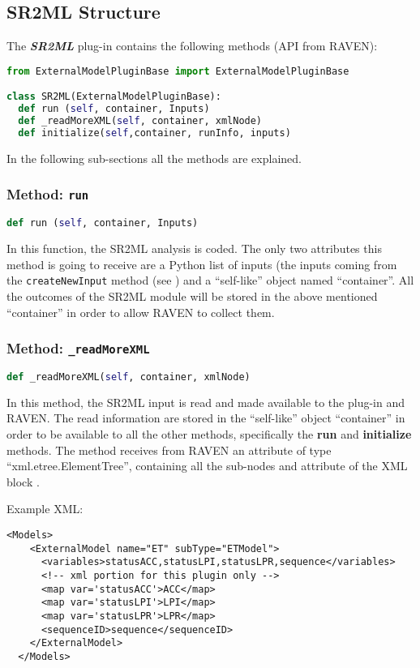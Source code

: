 \subsection{SR2ML Structure}
The  \textit{\textbf{SR2ML}} plug-in contains the following methods (API from RAVEN):

\begin{lstlisting}[language=python]
from ExternalModelPluginBase import ExternalModelPluginBase

class SR2ML(ExternalModelPluginBase):
  def run (self, container, Inputs)
  def _readMoreXML(self, container, xmlNode)
  def initialize(self,container, runInfo, inputs)
\end{lstlisting}
In the following sub-sections all the methods are explained.
\subsubsection{Method: \texttt{run}}
\label{subsubsec:runExternalModelPlugin}
\begin{lstlisting}[language=python]
def run (self, container, Inputs)
\end{lstlisting}

In this function, the SR2ML analysis is coded.
%
The only two attributes this method is going to receive are a Python list of inputs
(the inputs coming from the \texttt{createNewInput} method (see \cite{RAVENuserManual}) and a ``self-like'' object
named ``container''.
%
All the outcomes of the SR2ML module will be stored in the above mentioned ``container'' in order to
allow RAVEN to collect them.

\subsubsection{Method: \texttt{\_readMoreXML}}
\label{subsubsec:externalReadMoreXMLExternalModelPlugin}
\begin{lstlisting}[language=python]
def _readMoreXML(self, container, xmlNode)
\end{lstlisting}
In this method, the SR2ML input is read and made available to the plug-in and RAVEN.
%
The read information are stored in the ``self-like'' object ``container''
 in order to be available to all the other methods, specifically the  \textbf{run} and  \textbf{initialize} methods.
%
The method receives from RAVEN an attribute of type ``xml.etree.ElementTree'',
containing all the sub-nodes and attribute of the XML block .
%

Example XML:
\begin{lstlisting}[style=XML,morekeywords={subType,ModuleToLoad}]
  <Models>
    <ExternalModel name="ET" subType="ETModel">
      <variables>statusACC,statusLPI,statusLPR,sequence</variables>
      <!-- xml portion for this plugin only -->
      <map var='statusACC'>ACC</map>
      <map var='statusLPI'>LPI</map>
      <map var='statusLPR'>LPR</map>
      <sequenceID>sequence</sequenceID>
    </ExternalModel>
  </Models>
\end{lstlisting}

